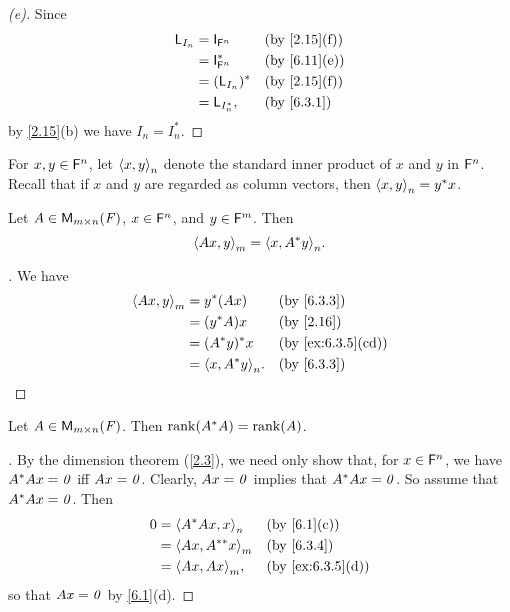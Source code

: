 \begin{proof}[(e)]
	Since
	\begin{align*}
		\L_{I_n} & = \IT[\vs{F}^n]   &  & \by{2.15}[f] \\
		         & = \IT[\vs{F}^n]^* &  & \by{6.11}[e] \\
		         & = (\L_{I_n})^*    &  & \by{2.15}[f] \\
		         & = \L_{I_n^*},     &  & \by{6.3.1}
	\end{align*}
	by \cref{2.15}(b) we have \(I_n = I_n^*\).
\end{proof}

\begin{defn}\label{6.3.3}
	For \(x, y \in \mathsf{F}^n\), let \(\left\langle x, y\right\rangle_n\) denote the standard inner product of \(x\) and \(y\) in \(\mathsf{F}^n\).
	Recall that if \(x\) and \(y\) are regarded as column vectors, then \(\left\langle x, y\right\rangle_n = y^* x\).
\end{defn}

\begin{lem}\label{6.3.4}
	Let \(A \in \mathsf{M}_{{m} \times n}({\mathit{F}})\), \(x \in \mathsf{F}^n\), and \(y \in \mathsf{F}^m\).
	Then
	\[
		\inn{Ax, y}_m = \inn{x, A^* y}_n.
	\]
\end{lem}

\begin{proof}[]
	We have
	\begin{align*}
		\inn{Ax, y}_m & = y^* (Ax)          &  & \by{6.3.3}        \\
		              & = (y^* A) x         &  & \by{2.16}         \\
		              & = (A^* y)^* x       &  & \by{ex:6.3.5}[cd] \\
		              & = \inn{x, A^* y}_n. &  & \by{6.3.3}
	\end{align*}
\end{proof}

\begin{lem}\label{6.3.5}
	Let \(A \in \mathsf{M}_{{m} \times n}({\mathit{F}})\).
	Then \(\rk{A^* A} = \rk{A}\).
\end{lem}

\begin{proof}[]
	By the dimension theorem (\cref{2.3}), we need only show that, for \(x \in \mathsf{F}^n\), we have \(A^* Ax = \mathit{0}\) iff \(Ax = \mathit{0}\).
	Clearly, \(Ax = \mathit{0}\) implies that \(A^* Ax = \mathit{0}\).
	So assume that \(A^* Ax = \mathit{0}\).
	Then
	\begin{align*}
		0 & = \inn{A^* Ax, x}_n    &  & \by{6.1}[c]      \\
		  & = \inn{Ax, A^{**} x}_m &  & \by{6.3.4}       \\
		  & = \inn{Ax, Ax}_m,      &  & \by{ex:6.3.5}[d]
	\end{align*}
	so that \(Ax = \mathit{0}\) by \cref{6.1}(d).
\end{proof}

